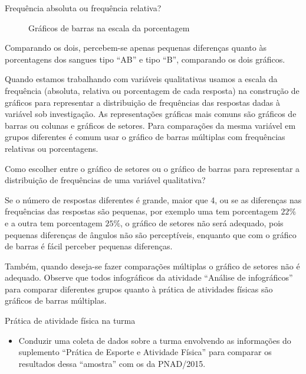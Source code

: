 {\begin{example}{Frequência absoluta ou frequência relativa?}
\begin{figure}[H]
\caption{Gráficos de barras na escala da porcentagem}
\label{sangue2}
\end{figure}


Comparando os dois, percebem-se apenas pequenas diferenças quanto às porcentagens dos sangues tipo “AB”{} e tipo “B”, comparando os dois gráficos.

\end{example}

Quando estamos trabalhando com variáveis qualitativas usamos a escala da frequência (absoluta, relativa ou porcentagem de cada resposta) na construção de gráficos para representar a distribuição de frequências das respostas dadas à variável sob investigação. As representações gráficas mais comuns são gráficos de barras ou colunas e gráficos de setores. Para comparações da mesma variável em grupos diferentes é comum usar o gráfico de barras múltiplas com frequências relativas ou porcentagens.

\begin{observation}{}

Como escolher entre o gráfico de setores ou o gráfico de barras para representar a distribuição de frequências de uma variável qualitativa?

Se o número de respostas diferentes é grande, maior que 4, ou se as diferenças nas frequências das respostas são pequenas, por exemplo uma tem porcentagem $22\%$ e a outra tem porcentagem $25\%$, o gráfico de setores não será adequado, pois pequenas diferenças de ângulos não são perceptíveis, enquanto que com o gráfico de barras é fácil perceber pequenas diferenças.

Também, quando deseja-se fazer comparações múltiplas o gráfico de setores não é adequado. Observe que todos infográficos da atividade “Análise de infográficos”{} para comparar diferentes grupos quanto à prática de atividades físicas são gráficos de barras múltiplas.

\end{observation}

\clearpage
\def\currentcolor{session2} 
\begin{objectives}{Prática de atividade física na turma}
{
\begin{itemize}
\item Conduzir uma coleta de dados sobre a turma envolvendo as informações do suplemento “Prática de Esporte e Atividade Física” para comparar os resultados dessa “amostra” com os da PNAD/2015.


\end{itemize}}
\end{objectives}}
